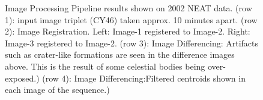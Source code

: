 \begin{figure}[h]
\begin{center}
\end{center}
\caption[caption]{Image Processing Pipeline results shown on 2002 NEAT data. 
(row 1):  input image triplet (CY46) taken approx. 10 minutes apart. 
(row 2): Image Registration. Left: Image-1 registered to Image-2. Right: Image-3 registered to Image-2. 
(row 3): Image Differencing: Artifacts such as crater-like formations are seen in the difference images above. This is the result of some celestial bodies being over-exposed.) 
(row 4): Image Differencing:Filtered centroids shown in each image of the sequence.)}
\label{IPP_NEAT_Layout1}
\end{figure}

